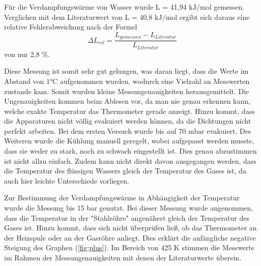 Für die Verdampfungswärme von Wasser wurde L = 41,94 $\si{\kilo \joule \per \mol}$
gemessen. Verglichen mit dem Literaturwert von L = 40,8 $\si{\kilo \joule \per \mol}$
\cite{chemie} ergibt sich daraus eine relative Fehlerabweichung nach der Formel
\begin{equation}
  \Delta L_{rel} = \frac{L_{gemessen}-L_{Literatur}}{L_{Literatur}}
\end{equation}
von nur 2,8 \%.

Diese Messung ist somit sehr gut gelungen, was daran liegt, dass die
Werte im Abstand von $1 \si{\celsius}$ aufgenommen wurden, wodurch eine Vielzahl
an Messwerten zustande kam. Somit wurden kleine Messungenauigkeiten herausgemittelt.
Die Ungenauigkeiten kommen beim Ablesen vor, da man nie genau erkennen kann, welche
exakte Temperatur das Thermometer gerade anzeigt. Hinzu kommt, dass die Apparaturen
nicht völlig evakuiert werden können, da die Dichtungen nicht perfekt arbeiten. Bei
dem ersten Versuch wurde bis auf 70 $\si{\milli \bar}$ evakuiert. Des Weiteren
wurde die Kühlung manuell geregelt, wobei aufgepasst werden musste, dass sie weder
zu stark, noch zu schwach eingestellt ist. Dies genau abzustimmen ist nicht
allzu einfach. Zudem kann nicht direkt davon ausgegangen werden, dass die Temperatur
des flüssigen Wassers gleich der Temperatur des Gases ist, da auch hier leichte
Unterschiede vorliegen.

Zur Bestimmung der Verdampfungswärme in Abhängigkeit der Temperatur wurde die Messung
bis 15 bar genutzt. Bei dieser Messung wurde angenommen, dass die Temperatur in
der "Stahlröhre" angenähert gleich der Temperatur des Gases ist. Hinzu kommt, dass
sich nicht überprüfen ließ, ob das Thermometer an der Heizspule oder an der Gasröhre
anliegt. Dies erklärt die anfängliche negative Steigung des Graphen (\ref{fig:plus}).
Im Bereich von 425 $\si{\kelvin}$ stimmen die Messwerte im Rahmen der Messungenauigkeiten
mit denen der Literaturwerte überein.
